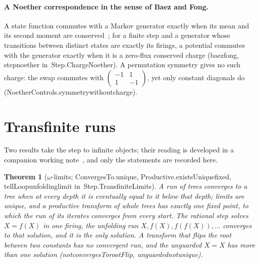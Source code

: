 \documentclass[11pt]{article}
\newtheorem{theorem}{Theorem}
\theoremstyle{remark}
\newcommand{\lean}[1]{{\ttfamily\def\_{\textunderscore\allowbreak}#1}}
\newcommand{\inmod}[1]{in~{\ttfamily\def\_{\textunderscore\allowbreak}#1}}
\begin{document}
\paragraph{A Noether correspondence in the sense of Baez and Fong.} A state function commutes with a
Markov generator exactly when its mean and its second moment are conserved~\cite{baezfong13}; for a finite
step and a generator whose transitions between distinct states are exactly its firings, a potential
commutes with the generator exactly when it is a zero-flux conserved charge (\lean{baez\_fong},
\lean{step\_noether} \inmod{Step.ChargeNoether}). A permutation symmetry gives no such charge: the swap
commutes with $\left(\begin{smallmatrix}-1&1\\1&-1\end{smallmatrix}\right)$, yet only constant diagonals
do (\lean{NoetherControls.symmetry\_without\_charge}).

\section{Transfinite runs}

Two results take the step to infinite objects; their reading is developed in a companion working
note~\cite{ultrainfinitism2}, and only the statements are recorded here.

\begin{theorem}[$\omega$-limits; \lean{ConvergesTo.unique}, \lean{Productive.existsUnique\_fixed}, \lean{tellLoop\_unfolding\_limit} \inmod{Step.TransfiniteLimits}]
A run of trees converges to a tree when at every depth it is eventually equal to it below that depth;
limits are unique, and a productive transform of whole trees has exactly one fixed point, to which the
run of its iterates converges from every start. The rational step solves $X = f(X)$ in one firing, the
unfolding run $X, f(X), f(f(X)), \dots$ converges to that solution, and it is the only solution. A
transform that flips the root between two constants has no convergent run, and the unguarded $X = X$ has
more than one solution (\lean{not\_convergesTo\_rootFlip}, \lean{unguarded\_not\_unique}).
\end{theorem}
\end{document}
